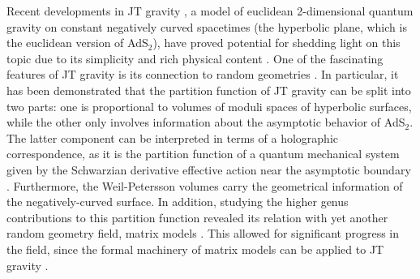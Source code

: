 \documentclass[a4paper,11pt]{article}
\begin{document}
Recent developments in JT gravity \cite{Jackiw:1984je,Teitelboim:1983ux}, a model of euclidean 2-dimensional quantum gravity on constant negatively curved spacetimes (the hyperbolic plane, which is the euclidean version of AdS$_2$), have proved potential for shedding light on this topic due to its simplicity and rich physical content \cite{Mertens:2022irh}. One of the fascinating features of JT gravity is its connection to random geometries \cite{Witten:2020bvl}.  In particular, it has been demonstrated that the partition function of JT gravity can be split into two parts: one is proportional to volumes of moduli spaces of hyperbolic surfaces, while the other only involves information about the asymptotic behavior of AdS$_2$. The latter component can be interpreted in terms of a holographic correspondence, as it is the partition function of a quantum mechanical system given by the Schwarzian derivative effective action near the asymptotic boundary \cite{Maldacena:2016upp, Kitaev}. Furthermore, the Weil-Petersson volumes carry the geometrical information of the negatively-curved surface. In addition, studying the higher genus contributions to this partition function revealed its relation with yet another random geometry field, matrix models \cite{Saad:2019lba,Stanford:2019vob}. This allowed for significant progress in the field, since the formal machinery of matrix models \cite{Eynard:2016yaa} can be applied to JT gravity \cite{Johnson:2019eik}. 
\end{document}
